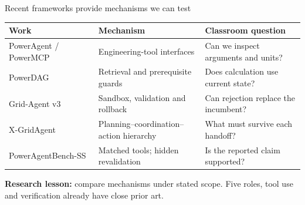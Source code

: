 \begin{frame}[t]{Recent frameworks provide mechanisms we can test}
\small
\begin{tabular}{@{}>{\raggedright\arraybackslash}p{.24\linewidth}>{\raggedright\arraybackslash}p{.34\linewidth}>{\raggedright\arraybackslash}p{.34\linewidth}@{}}
\toprule Work & Mechanism & Classroom question \\
\midrule
PowerAgent / PowerMCP & Engineering-tool interfaces & Can we inspect arguments and units? \\
PowerDAG & Retrieval and prerequisite guards & Does calculation use current state? \\
Grid-Agent v3 & Sandbox, validation and rollback & Can rejection replace the incumbent? \\
X-GridAgent & Planning--coordination--action hierarchy & What must survive each handoff? \\
PowerAgentBench-SS & Matched tools; hidden revalidation & Is the reported claim supported? \\
\bottomrule
\end{tabular}\par\medskip
\textbf{Research lesson:} compare mechanisms under stated scope. Five roles, tool use and verification already have close prior art.
\end{frame}

